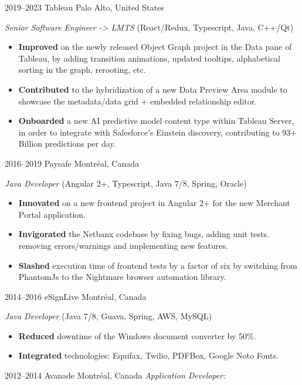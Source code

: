 \documentclass[]{friggeri-cv}
\begin{document}
\begin{entrylist}
\entry
{2019--2023}
{Tableau}
{Palo Alto, United States}
{\emph{Senior Software Engineer -> LMTS} (React/Redux, Typescript, Java, C++/Qt)
\begin{itemize}
	\item \textbf{Improved} on the newly released Object Graph project in the Data pane of Tableau, by adding transition animations, updated tooltips, alphabetical sorting in the graph, rerooting, etc.
	\item \textbf{Contributed} to the hybridization of a new Data Preview Area module to showcase the metadata/data grid + embedded relationship editor.
	\item \textbf{Onboarded} a new AI predictive model content type within Tableau Server, in order to integrate with Salesforce's Einstein discovery, contributing to 93+ Billion predictions per day.
\end{itemize}
}
\end{entrylist}

\begin{entrylist}
\entry
{2016--2019}
{Paysafe}
{Montréal, Canada}
{\emph{Java Developer} (Angular 2+, Typescript, Java 7/8, Spring, Oracle)
\begin{itemize}
	\item \textbf{Innovated} on a new frontend project in Angular 2+ for the new Merchant Portal application.
	\item \textbf{Invigorated} the Netbanx codebase by fixing bugs, adding unit tests. removing errors/warnings and implementing new features.
	\item \textbf{Slashed} execution time of frontend tests by a factor of six by switching from PhantomJs to the Nightmare browser automation library.
\end{itemize}
}
\end{entrylist}

\begin{entrylist}
\entry
{2014--2016}
{eSignLive}
{Montréal, Canada}
{\emph{Java Developer} (Java 7/8, Guava, Spring, AWS, MySQL)
\begin{itemize}
\item \textbf{Reduced} downtime of the Windows document converter by 50\%.
\item \textbf{Integrated} technologies: Equifax, Twilio, PDFBox, Google Noto Fonts.
\end{itemize}
}
\end{entrylist}

\begin{entrylist}
\entry
{2012--2014}
{Avanade}
{Montréal, Canada}
{\emph{Application Developer:}
}
\end{entrylist}
\end{document}
